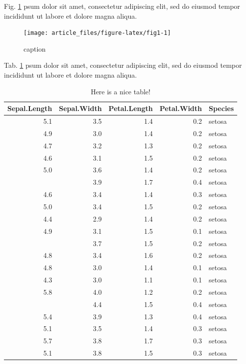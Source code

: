 \documentclass[bgd, online, hvmath]{style/copernicus}
\begin{document}
Fig. \ref{fig:fig1} psum dolor sit amet, consectetur adipiscing elit,
sed do eiusmod tempor incididunt ut labore et dolore magna aliqua.

\begin{figure}

{\centering \texttt{[image: article\_files/figure-latex/fig1-1]} 

}

\caption{caption}\label{fig:fig1}
\end{figure}

Tab. \ref{tab:tab1} psum dolor sit amet, consectetur adipiscing elit,
sed do eiusmod tempor incididunt ut labore et dolore magna aliqua.

\begin{table}

\caption{\label{tab:tab1}Here is a nice table!}
\centering
\begin{tabular}[t]{rrrrl}
\toprule
Sepal.Length & Sepal.Width & Petal.Length & Petal.Width & Species\\
\midrule
5.1 & 3.5 & 1.4 & 0.2 & setosa\\
4.9 & 3.0 & 1.4 & 0.2 & setosa\\
4.7 & 3.2 & 1.3 & 0.2 & setosa\\
4.6 & 3.1 & 1.5 & 0.2 & setosa\\
5.0 & 3.6 & 1.4 & 0.2 & setosa\\
\addlinespace
5.4 & 3.9 & 1.7 & 0.4 & setosa\\
4.6 & 3.4 & 1.4 & 0.3 & setosa\\
5.0 & 3.4 & 1.5 & 0.2 & setosa\\
4.4 & 2.9 & 1.4 & 0.2 & setosa\\
4.9 & 3.1 & 1.5 & 0.1 & setosa\\
\addlinespace
5.4 & 3.7 & 1.5 & 0.2 & setosa\\
4.8 & 3.4 & 1.6 & 0.2 & setosa\\
4.8 & 3.0 & 1.4 & 0.1 & setosa\\
4.3 & 3.0 & 1.1 & 0.1 & setosa\\
5.8 & 4.0 & 1.2 & 0.2 & setosa\\
\addlinespace
5.7 & 4.4 & 1.5 & 0.4 & setosa\\
5.4 & 3.9 & 1.3 & 0.4 & setosa\\
5.1 & 3.5 & 1.4 & 0.3 & setosa\\
5.7 & 3.8 & 1.7 & 0.3 & setosa\\
5.1 & 3.8 & 1.5 & 0.3 & setosa\\
\bottomrule
\end{tabular}
\end{table}
\end{document}
